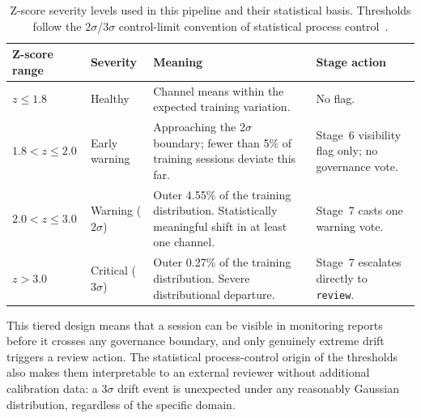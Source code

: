 \renewcommand{\arraystretch}{1.2}
\begin{table}[htbp]
\centering
\footnotesize
\caption[Z-score severity levels and their statistical basis.]{Z-score severity levels used
in this pipeline and their statistical basis. Thresholds follow the $2\sigma$/$3\sigma$
control-limit convention of statistical process control~\cite{page1954cusum,gama2014survey}.}
\label{tab:zscore_severity}
\begin{tabularx}{\textwidth}{p{2.4cm} p{2.2cm} X p{2.8cm}}
\toprule
\textbf{Z-score range} & \textbf{Severity} & \textbf{Meaning} & \textbf{Stage action} \\
\midrule
$z \leq 1.8$ & Healthy & Channel means within the expected training variation. & No flag. \\
$1.8 < z \leq 2.0$ & Early warning & Approaching the $2\sigma$ boundary; fewer than 5\% of training sessions deviate this far. & Stage~6 visibility flag only; no governance vote. \\
$2.0 < z \leq 3.0$ & Warning ($2\sigma$) & Outer 4.55\% of the training distribution. Statistically meaningful shift in at least one channel. & Stage~7 casts one warning vote. \\
$z > 3.0$ & Critical ($3\sigma$) & Outer 0.27\% of the training distribution. Severe distributional departure. & Stage~7 escalates directly to \texttt{review}. \\
\bottomrule
\end{tabularx}
\renewcommand{\arraystretch}{1.0}
\end{table}

This tiered design means that a session can be visible in monitoring reports before it
crosses any governance boundary, and only genuinely extreme drift triggers a review action.
The statistical process-control origin of the thresholds also makes them interpretable to
an external reviewer without additional calibration data: a $3\sigma$ drift event is
unexpected under any reasonably Gaussian distribution, regardless of the specific domain.

